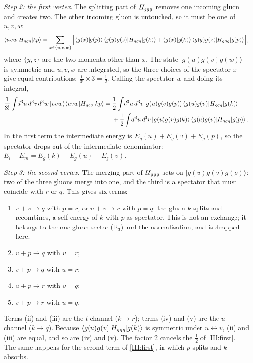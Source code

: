 \emph{Step 2: the first vertex.} The splitting part of $H_{ggg}$ removes one incoming gluon and creates two. The other incoming gluon is untouched, so it must be one of $u,v,w$:
\[
\langle uvw|H_{ggg}|kp\rangle=\sum_{x\in\{u,v,w\}}\Big[\langle g(x)|g(p)\rangle\,\langle g(y)g(z)|H_{ggg}|g(k)\rangle+\langle g(x)|g(k)\rangle\,\langle g(y)g(z)|H_{ggg}|g(p)\rangle\Big],
\]
where $\{y,z\}$ are the two momenta other than $x$. The state $|g(u)g(v)g(w)\rangle$ is symmetric and $u,v,w$ are integrated, so the three choices of the spectator $x$ give equal contributions: $\frac{1}{3!}\times3=\frac12$. Calling the spectator $w$ and doing its integral,
\begin{align}
\frac{1}{3!}\int\! d^3u\,d^3v\,d^3w\,|uvw\rangle\langle uvw|H_{ggg}|kp\rangle
={}&\frac12\int\! d^3u\,d^3v\,|g(u)g(v)g(p)\rangle\,\langle g(u)g(v)|H_{ggg}|g(k)\rangle\nonumber\\
&+\frac12\int\! d^3u\,d^3v\,|g(u)g(v)g(k)\rangle\,\langle g(u)g(v)|H_{ggg}|g(p)\rangle\,.
\label{III:first}
\end{align}
In the first term the intermediate energy is $E_g(u)+E_g(v)+E_g(p)$, so the spectator drops out of the intermediate denominator: $E_i-E_m=E_g(k)-E_g(u)-E_g(v)$.

\emph{Step 3: the second vertex.} The merging part of $H_{ggg}$ acts on $|g(u)g(v)g(p)\rangle$: two of the three gluons merge into one, and the third is a spectator that must coincide with $r$ or $q$. This gives six terms:
\begin{enumerate}[label=(\roman*),leftmargin=24pt,itemsep=1pt]
\item $u+v\to q$ with $p=r$, or $u+v\to r$ with $p=q$: the gluon $k$ splits and recombines, a self-energy of $k$ with $p$ as spectator. This is not an exchange; it belongs to the one-gluon sector ($\mathbb B_3$) and the normalisation, and is dropped here.
\item $u+p\to q$ with $v=r$;
\item $v+p\to q$ with $u=r$;
\item $u+p\to r$ with $v=q$;
\item $v+p\to r$ with $u=q$.
\end{enumerate}
Terms (ii) and (iii) are the $t$-channel ($k\to r$); terms (iv) and (v) are the $u$-channel ($k\to q$).
Because $\langle g(u)g(v)|H_{ggg}|g(k)\rangle$ is symmetric under $u\leftrightarrow v$, (ii) and (iii) are equal, and so are (iv) and (v). The factor 2 cancels the $\frac12$ of \eqref{III:first}. The same happens for the second term of \eqref{III:first}, in which $p$ splits and $k$ absorbs.

